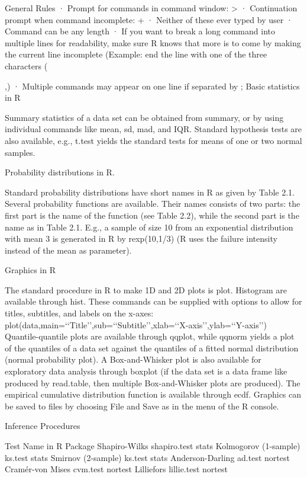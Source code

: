 General Rules
· Prompt for commands in command window: >
· Continuation prompt when command incomplete: +
· Neither of these ever typed by user
· Command can be any length
· If you want to break a long command into multiple lines for readability, make sure R knows that more is to come by making the current line incomplete (Example: end the line with one of the three characters ({,)
· Multiple commands may appear on one line if separated by ;
Basic statistics in R

Summary statistics of a data set can be obtained from summary, or by using individual commands
like mean, sd, mad, and IQR. Standard hypothesis tests are also available, e.g., t.test
yields the standard tests for means of one or two normal samples. 
 
Probability distributions in R.

Standard probability distributions have short names in R as given by Table 2.1. Several
probability functions are available. Their names consists of two parts: the first part is the
name of the function (see Table 2.2), while the second part is the name as in Table 2.1.
E.g., a sample of size 10 from an exponential distribution with mean 3 is generated in R by
rexp(10,1/3) (R uses the failure intensity instead of the mean as parameter).

Graphics in R

The standard procedure in R to make 1D and 2D plots is plot. Histogram are available
through hist. These commands can be supplied with options to allow for titles, subtitles,
and labels on the x-axes:
plot(data,main=‘‘Title’’,sub=‘‘Subtitle’’,xlab=‘‘X-axis’’,ylab=‘‘Y-axis’’)
Quantile-quantile plots are available through qqplot, while qqnorm yields a plot of the quantiles
of a data set against the quantiles of a fitted normal distribution (normal probability plot).
A Box-and-Whisker plot is also available for exploratory data analysis through boxplot (if
the data set is a data frame like produced by read.table, then multiple Box-and-Whisker
plots are produced). The empirical cumulative distribution function is available through ecdf.
Graphics can be saved to files by choosing File and Save as in the menu of the R console. 
 
Inference Procedures
 
Test
Name in R
Package
Shapiro-Wilks
shapiro.test
stats
Kolmogorov (1-sample)
ks.test
stats
Smirnov (2-sample)
ks.test
stats
Anderson-Darling
ad.test
nortest
Cramér-von Mises
cvm.test
nortest
Lilliefors
lillie.test
nortest

}
